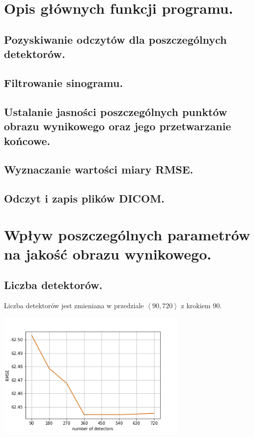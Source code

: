\documentclass[paper=a4, fontsize=11pt]{scrartcl}
\begin{document}
	\section{Opis głównych funkcji programu.}
	\subsection{Pozyskiwanie odczytów dla poszczególnych detektorów.}
	\subsection{Filtrowanie sinogramu.}
	\subsection{Ustalanie jasności poszczególnych punktów obrazu wynikowego oraz jego przetwarzanie końcowe.}
	\subsection{Wyznaczanie wartości miary RMSE.}
	\subsection{Odczyt i zapis plików DICOM.}
	
	\section{Wpływ poszczególnych parametrów na jakość obrazu wynikowego.}
	\subsection{Liczba detektorów.}
	
	Liczba detektorów jest zmieniana w przedziale $\left<90, 720 \right>$ z krokiem $90$.
	
	\begin{center}
		\includegraphics[width=0.7\textwidth]{detectors.png}
	\end{center}
\end{document}
